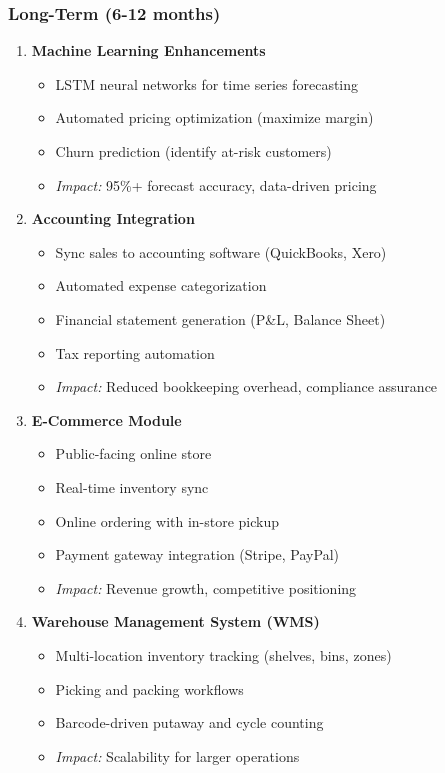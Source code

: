 \subsubsection{Long-Term (6-12 months)}

\begin{enumerate}[leftmargin=*]
    \item \textbf{Machine Learning Enhancements}
    \begin{itemize}
        \item LSTM neural networks for time series forecasting
        \item Automated pricing optimization (maximize margin)
        \item Churn prediction (identify at-risk customers)
        \item \textit{Impact:} 95\%+ forecast accuracy, data-driven pricing
    \end{itemize}
    
    \item \textbf{Accounting Integration}
    \begin{itemize}
        \item Sync sales to accounting software (QuickBooks, Xero)
        \item Automated expense categorization
        \item Financial statement generation (P\&L, Balance Sheet)
        \item Tax reporting automation
        \item \textit{Impact:} Reduced bookkeeping overhead, compliance assurance
    \end{itemize}
    
    \item \textbf{E-Commerce Module}
    \begin{itemize}
        \item Public-facing online store
        \item Real-time inventory sync
        \item Online ordering with in-store pickup
        \item Payment gateway integration (Stripe, PayPal)
        \item \textit{Impact:} Revenue growth, competitive positioning
    \end{itemize}
    
    \item \textbf{Warehouse Management System (WMS)}
    \begin{itemize}
        \item Multi-location inventory tracking (shelves, bins, zones)
        \item Picking and packing workflows
        \item Barcode-driven putaway and cycle counting
        \item \textit{Impact:} Scalability for larger operations
    \end{itemize}
\end{enumerate}

